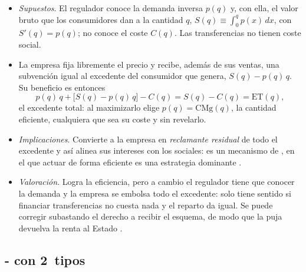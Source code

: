 \documentclass[11pt]{article}
\begin{document}
\begin{itemize}
\item \emph{Supuestos}. El regulador conoce la demanda inversa $p(q)$ y, con ella, el valor bruto que los consumidores dan a la cantidad $q$, $S(q)\equiv\int_0^q p(x)\,dx$, con $S'(q)=p(q)$; no conoce el coste $C(q)$. Las transferencias no tienen coste social.
\item La empresa fija libremente el precio y recibe, además de sus ventas, una subvención igual al excedente del consumidor que genera, $S(q)-p(q)\,q$. Su beneficio es entonces
  \[
  p(q)\,q+\big[S(q)-p(q)\,q\big]-C(q)=S(q)-C(q)=\mathrm{ET}(q),
  \]
  el excedente total: al maximizarlo elige $p(q)=\mathrm{CMg}(q)$, la cantidad eficiente, cualquiera que sea su coste y sin revelarlo.
\item \emph{Implicaciones}. Convierte a la empresa en \emph{reclamante residual} de todo el excedente y así alinea sus intereses con los sociales: es un mecanismo de , en el que actuar de forma eficiente es una estrategia dominante\nocite{LaffontMartimort2002Theory}  .
\item \emph{Valoración}. Logra la eficiencia, pero a cambio el regulador tiene que conocer la demanda y la empresa se embolsa todo el excedente: solo tiene sentido si financiar transferencias no cuesta nada y el reparto da igual. Se puede corregir subastando el derecho a recibir el esquema, de modo que la puja devuelva la renta al Estado .
\end{itemize}

\subsection{- con 2~tipos}\label{anexo:baron-myerson}
\end{document}
